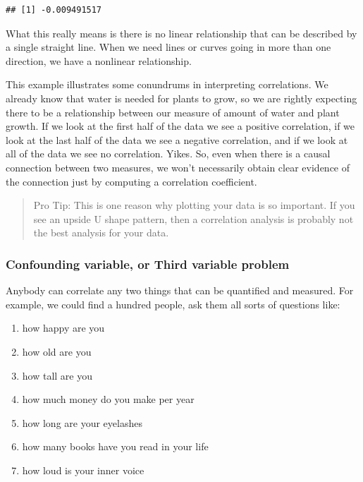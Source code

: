 \documentclass[
]{book}
\providecommand{\tightlist}{%
  \setlength{\itemsep}{0pt}\setlength{\parskip}{0pt}}
\begin{document}
\begin{verbatim}
## [1] -0.009491517
\end{verbatim}

What this really means is there is no linear relationship that can be described by a single straight line. When we need lines or curves going in more than one direction, we have a nonlinear relationship.

This example illustrates some conundrums in interpreting correlations. We already know that water is needed for plants to grow, so we are rightly expecting there to be a relationship between our measure of amount of water and plant growth. If we look at the first half of the data we see a positive correlation, if we look at the last half of the data we see a negative correlation, and if we look at all of the data we see no correlation. Yikes. So, even when there is a causal connection between two measures, we won't necessarily obtain clear evidence of the connection just by computing a correlation coefficient.

\begin{quote}
Pro Tip: This is one reason why plotting your data is so important. If you see an upside U shape pattern, then a correlation analysis is probably not the best analysis for your data.
\end{quote}

\hypertarget{confounding-variable-or-third-variable-problem}{%
\subsubsection{Confounding variable, or Third variable problem}\label{confounding-variable-or-third-variable-problem}}

Anybody can correlate any two things that can be quantified and measured. For example, we could find a hundred people, ask them all sorts of questions like:

\begin{enumerate}
\def\labelenumi{\arabic{enumi}.}
\tightlist
\item
  how happy are you
\item
  how old are you
\item
  how tall are you
\item
  how much money do you make per year
\item
  how long are your eyelashes
\item
  how many books have you read in your life
\item
  how loud is your inner voice
\end{enumerate}
\end{document}
